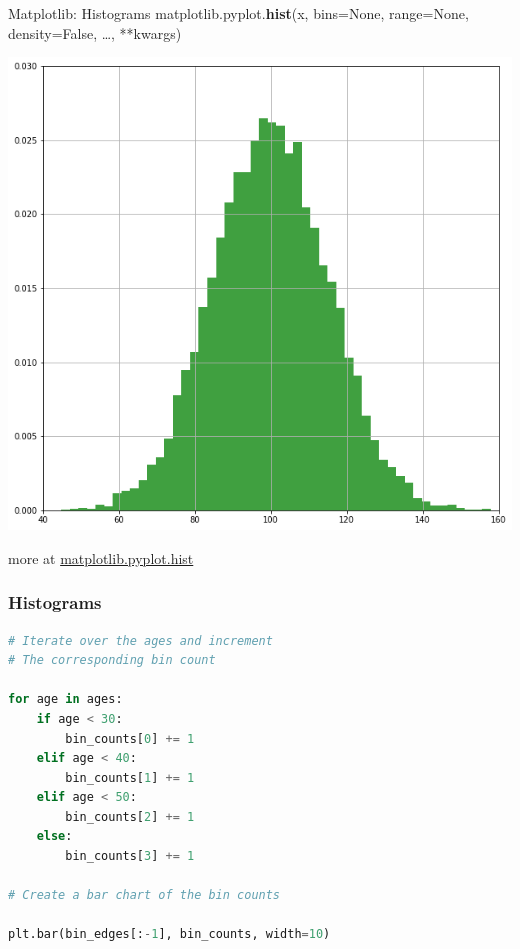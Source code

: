 \documentclass{beamer}
\begin{document}
    \begin{frame}[fragile]{Matplotlib: Histograms}
        matplotlib.pyplot.\textbf{hist}(x, bins=None, range=None, density=False, \dots, **kwargs)\\
        \begin{center}
            \includegraphics[width=\textwidth,height=0.6\textheight,keepaspectratio]{figures/Hist.png}\\
        \end{center}
        more at \href{https://matplotlib.org/stable/api/_as_gen/matplotlib.pyplot.hist.html}{matplotlib.pyplot.hist}
    \end{frame}

    \begin{frame}[fragile]
        \frametitle{Histograms}
        \begin{lstlisting}[language=Python]
# Iterate over the ages and increment
# The corresponding bin count

for age in ages:
    if age < 30:
        bin_counts[0] += 1
    elif age < 40:
        bin_counts[1] += 1
    elif age < 50:
        bin_counts[2] += 1
    else:
        bin_counts[3] += 1

# Create a bar chart of the bin counts

plt.bar(bin_edges[:-1], bin_counts, width=10)
        \end{lstlisting}
    \end{frame}
\end{document}
